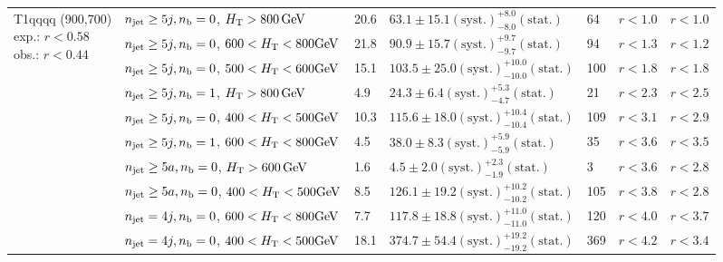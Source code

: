 \begin{table}[h!]
\begin{tabular}{ lllllll }
\multirow{10}{*}{\parbox[t]{2cm}{T1qqqq (900,700)\\exp.: $r<0.58$\\obs.: $r<0.44$}}
 & $n_{\mathrm{jet}} \geq5j,n_{\text{b}} =0$, $\mbox{$H_\text{T}$} > 800 \, \mathrm{GeV}$ & 20.6 & $63.1 \pm 15.1 \mathrm{(syst.)} ^{+8.0}_{-8.0} \mathrm{(stat.)}$ & 64 & $r < 1.0$ & $r < 1.0$\\ 
 & $n_{\mathrm{jet}} \geq5j,n_{\text{b}} =0$, $600 < \mbox{$H_\text{T}$} < 800 \mathrm{GeV}$ & 21.8 & $90.9 \pm 15.7 \mathrm{(syst.)} ^{+9.7}_{-9.7} \mathrm{(stat.)}$ & 94 & $r < 1.3$ & $r < 1.2$\\ 
 & $n_{\mathrm{jet}} \geq5j,n_{\text{b}} =0$, $500 < \mbox{$H_\text{T}$} < 600 \mathrm{GeV}$ & 15.1 & $103.5 \pm 25.0 \mathrm{(syst.)} ^{+10.0}_{-10.0} \mathrm{(stat.)}$ & 100 & $r < 1.8$ & $r < 1.8$\\ 
 & $n_{\mathrm{jet}} \geq5j,n_{\text{b}} =1$, $\mbox{$H_\text{T}$} > 800 \, \mathrm{GeV}$ & 4.9 & $24.3 \pm 6.4 \mathrm{(syst.)} ^{+5.3}_{-4.7} \mathrm{(stat.)}$ & 21 & $r < 2.3$ & $r < 2.5$\\ 
 & $n_{\mathrm{jet}} \geq5j,n_{\text{b}} =0$, $400 < \mbox{$H_\text{T}$} < 500 \mathrm{GeV}$ & 10.3 & $115.6 \pm 18.0 \mathrm{(syst.)} ^{+10.4}_{-10.4} \mathrm{(stat.)}$ & 109 & $r < 3.1$ & $r < 2.9$\\ 
 & $n_{\mathrm{jet}} \geq5j,n_{\text{b}} =1$, $600 < \mbox{$H_\text{T}$} < 800 \mathrm{GeV}$ & 4.5 & $38.0 \pm 8.3 \mathrm{(syst.)} ^{+5.9}_{-5.9} \mathrm{(stat.)}$ & 35 & $r < 3.6$ & $r < 3.5$\\ 
 & $n_{\mathrm{jet}} \geq5a,n_{\text{b}} =0$, $\mbox{$H_\text{T}$} > 600 \, \mathrm{GeV}$ & 1.6 & $4.5 \pm 2.0 \mathrm{(syst.)} ^{+2.3}_{-1.9} \mathrm{(stat.)}$ & 3 & $r < 3.6$ & $r < 2.8$\\ 
 & $n_{\mathrm{jet}} \geq5a,n_{\text{b}} =0$, $400 < \mbox{$H_\text{T}$} < 500 \mathrm{GeV}$ & 8.5 & $126.1 \pm 19.2 \mathrm{(syst.)} ^{+10.2}_{-10.2} \mathrm{(stat.)}$ & 105 & $r < 3.8$ & $r < 2.8$\\ 
 & $n_{\mathrm{jet}} =4j,n_{\text{b}} =0$, $600 < \mbox{$H_\text{T}$} < 800 \mathrm{GeV}$ & 7.7 & $117.8 \pm 18.8 \mathrm{(syst.)} ^{+11.0}_{-11.0} \mathrm{(stat.)}$ & 120 & $r < 4.0$ & $r < 3.7$\\ 
 & $n_{\mathrm{jet}} =4j,n_{\text{b}} =0$, $400 < \mbox{$H_\text{T}$} < 500 \mathrm{GeV}$ & 18.1 & $374.7 \pm 54.4 \mathrm{(syst.)} ^{+19.2}_{-19.2} \mathrm{(stat.)}$ & 369 & $r < 4.2$ & $r < 3.4$\\ \hline
    \hline
  \end{tabular}
\end{table}

